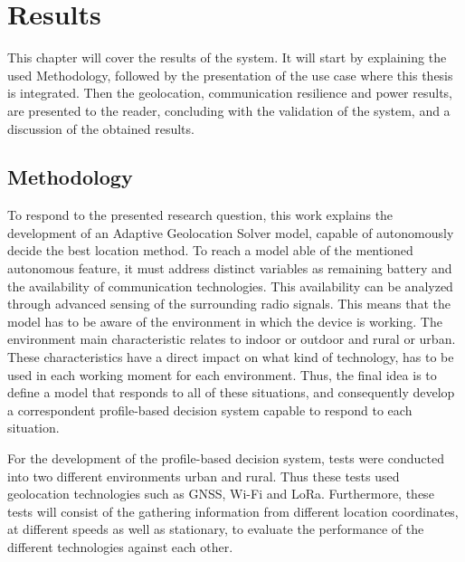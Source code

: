 \chapter{Results}
\label{cha:Results}
This chapter will cover the results of the system.  It will start by explaining the used Methodology, followed by the presentation of the use case where this thesis is integrated.
Then the geolocation, communication resilience and power results, are presented to the reader, concluding with the validation of the system, and a discussion of the obtained results.

\section{Methodology}
\label{sec:methodology}


To respond to the  presented  research question, this work explains the development of an Adaptive Geolocation Solver model, capable of autonomously decide the best location method. To reach a model able of the mentioned autonomous feature, it must address distinct variables as remaining battery and the availability of communication technologies. This availability can be analyzed through advanced sensing of the surrounding radio signals. This means that the model has to be aware of the environment in which the device is working. The environment main characteristic relates to indoor or outdoor and rural or urban. 
These characteristics have a direct impact on what kind of technology, has to be used in each working moment for each environment. Thus, the final idea is to define a model that responds to all of these situations, and consequently develop a correspondent profile-based decision system capable to respond to each situation.


For the development of the profile-based decision system, tests were conducted into two different environments urban and rural. Thus these tests used geolocation technologies such as GNSS, Wi-Fi and LoRa.
Furthermore, these tests will consist of the gathering information from different location coordinates, at different speeds as well as stationary, to evaluate the performance of the different technologies against each other. 

